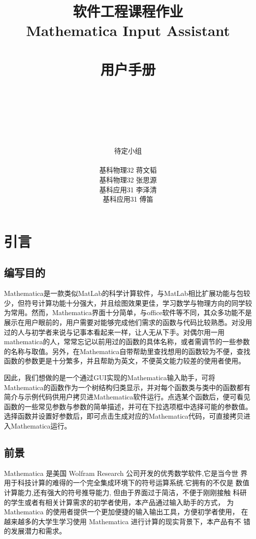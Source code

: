 \documentclass[hyperref, UTF8
,bookmarksnumbered=true, oneside]{ctexbook}
\title{\huge{软件工程课程作业}\\ \Huge \textbf{Mathematica Input Assistant} \\\phantom{aaa} \\\Huge{用户手册}}
\author{\\ \phantom{aaa} \\\phantom{aaa} \\ \phantom{aaa}\\\\\\\huge{待定小组}\\\\ \Large{基科物理32{  }蒋文韬}\\ \Large{基科物理32{ }张思源{ }}\\ \Large{基科应用31{ }李泽清{ }} \\ \Large{基科应用31 { }傅笛{ }} }
\begin{document}
\Large

\frontmatter
\maketitle 

\tableofcontents

\mainmatter

\chapter{引言}

	\section{编写目的} %

		Mathematica是一款类似MatLab的科学计算软件，与MatLab相比扩展功能与包较少，但符号计算功能十分强大，并且绘图效果更佳，学习数学与物理方向的同学较为常用。然而，Mathematica界面十分简单，与office软件等不同，其众多功能不是展示在用户眼前的，用户需要对能够完成他们需求的函数与代码比较熟悉。对没用过的人与初学者来说与记事本看起来一样，让人无从下手。对偶尔用一用mathematica的人，常常忘记以前用过的函数的具体名称，或者需调节的一些参数的名称与取值。另外，在Mathematica自带帮助里查找想用的函数较为不便，查找函数的参数更是十分繁多，并且帮助为英文，不便英文能力较差的使用者使用。

		因此，我们想做的是一个通过GUI实现的Mathematica输入助手，可将Mathematica的函数作为一个树结构归类显示，并对每个函数类与类中的函数都有简介与示例代码供用户拷贝进Mathematica软件运行。点选某个函数后，便可看见函数的一些常见参数与参数的简单描述，并可在下拉选项框中选择可能的参数值。选择函数并设置好参数后，即可点击生成对应的Mathematica代码，可直接拷贝进入Mathematica运行。
		

	\section{前景} %

		Mathematica 是美国 Wolfram Research 公司开发的优秀数学软件,它是当今世
界用于科技计算的难得的一个完全集成环境下的符号运算系统.它拥有的不仅是
数值计算能力,还有强大的符号推导能力, 但由于界面过于简洁，不便于刚刚接触
科研的学生或者有相关计算需求的初学者使用，本产品通过输入助手的方式，
为 Mathematica 的使用者提供一个更加便捷的输入输出工具，方便初学者使用，
在越来越多的大学生学习使用 Mathematica 进行计算的现实背景下，本产品有不
错的发展潜力和需求。
		
\end{document}
